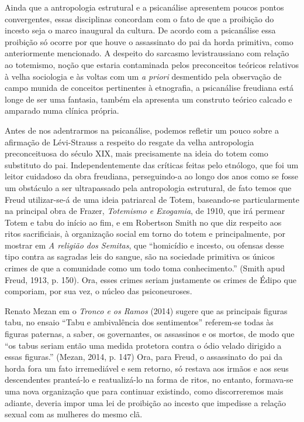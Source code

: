 Ainda que a antropologia estrutural e a psicanálise apresentem poucos
pontos convergentes, essas disciplinas concordam com o fato de que a
proibição do incesto seja o marco inaugural da cultura. De acordo com a
psicanálise essa proibição só ocorre por que houve o assassinato do pai
da horda primitiva, como anteriormente mencionado. A despeito do
sarcasmo levistraussiano com relação ao totemismo, noção que estaria
contaminada pelos preconceitos teóricos relativos à velha sociologia e
às voltas com um \emph{a priori} desmentido pela observação de campo
munida de conceitos pertinentes à etnografia, a psicanálise freudiana
está longe de ser uma fantasia, também ela apresenta um construto
teórico calcado e amparado numa clínica própria.

Antes de nos adentrarmos na psicanálise, podemos refletir um pouco sobre
a afirmação de Lévi-Strauss a respeito do resgate da velha antropologia
preconceituosa do século XIX, mais precisamente na ideia do totem como
substituto do pai. Independentemente das críticas feitas pelo etnólogo,
que foi um leitor cuidadoso da obra freudiana, perseguindo-a ao longo
dos anos como se fosse um obstáculo a ser ultrapassado pela antropologia
estrutural, de fato temos que Freud utilizar-se-á de uma ideia
patriarcal de Totem, baseando-se particularmente na principal obra de
Frazer, \emph{Totemismo e Exogamia}, de 1910, que irá permear Totem e
tabu do início ao fim, e em Robertson Smith no que diz respeito aos
ritos sacrificiais, à organização social em torno do totem e
principalmente, por mostrar em \emph{A religião dos Semitas}, que
``homicídio e incesto, ou ofensas desse tipo contra as sagradas leis do
sangue, são na sociedade primitiva os únicos crimes de que a comunidade
como um todo toma conhecimento.'' (Smith apud Freud, 1913, p. 150). Ora,
esses crimes seriam justamente os crimes de Édipo que comporiam, por sua
vez, o núcleo das psiconeuroses.

Renato Mezan em o \emph{Tronco e os Ramos} (2014) sugere que as
principais figuras tabu, no ensaio ``Tabu e ambivalência dos
sentimentos'' referem-se todas às figuras paternas, a saber, os
governantes, os assassinos e os mortos, de modo que ``os tabus seriam
então uma medida protetora contra o ódio velado dirigido a essas
figuras.'' (Mezan, 2014, p. 147) Ora, para Freud, o assassinato do pai
da horda fora um fato irremediável e sem retorno, só restava aos irmãos
e aos seus descendentes pranteá-lo e reatualizá-lo na forma de ritos, no
entanto, formava-se uma nova organização que para continuar existindo,
como discorreremos mais adiante, deveria impor uma lei de proibição ao
incesto que impedisse a relação sexual com as mulheres do mesmo clã.

